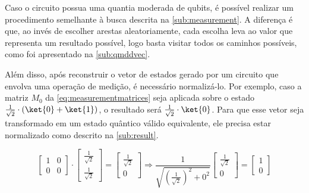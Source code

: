 Caso o circuito possua uma quantia moderada de qubits, é possível realizar um procedimento semelhante à busca descrita na \cref{sub:measurement}. A diferença é que, ao invés de escolher arestas aleatoriamente, cada escolha leva ao valor que representa um resultado possível, logo basta visitar todos os caminhos possíveis, como foi apresentado na \cref{sub:qmddvec}.

Além disso, após reconstruir o vetor de estados gerado por um circuito que envolva uma operação de medição, é necessário normalizá-lo. Por exemplo, caso a matriz $M_0$ da \cref{eq:measurementmatrices} seja aplicada sobre o estado $\frac{1}{\sqrt{2}}\cdot(\ket{0} + \ket{1})$, o resultado será $\frac{1}{\sqrt{2}}\cdot\ket{0}$. Para que esse vetor seja transformado em um estado quântico válido equivalente, ele precisa estar normalizado como descrito na \cref{sub:result}.

\begin{equation}
  \begin{bmatrix}
    1 & 0 \\
    0 & 0
  \end{bmatrix}
  \cdot
  \begin{bmatrix}
    \frac{1}{\sqrt{2}} \\
    \frac{1}{\sqrt{2}}
  \end{bmatrix}
  =
  \begin{bmatrix}
    \frac{1}{\sqrt{2}} \\
    0
  \end{bmatrix}
  \Longrightarrow
  \frac{1}{\sqrt{(\frac{1}{\sqrt{2}})^2 + 0^2}}
  \begin{bmatrix}
    \frac{1}{\sqrt{2}} \\
    0
  \end{bmatrix}
  =
  \begin{bmatrix}
    1 \\
    0
  \end{bmatrix}
\end{equation}
